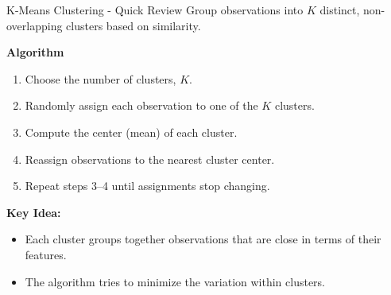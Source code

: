 \documentclass[aspectratio=169,xcolor=dvipsnames]{beamer}
\begin{document}
\begin{frame}{K-Means Clustering - Quick Review}
 Group observations into $K$ distinct, non-overlapping clusters based on similarity.

  \vspace{0.3cm}
  \textbf{Algorithm}
  \begin{enumerate}
    \item Choose the number of clusters, $K$.
    \item Randomly assign each observation to one of the $K$ clusters.
    \item Compute the center (mean) of each cluster.
    \item Reassign observations to the nearest cluster center.
    \item Repeat steps 3–4 until assignments stop changing.
  \end{enumerate}

  \vspace{0.3cm}
  \textbf{Key Idea:} 
  \begin{itemize}
    \item Each cluster groups together observations that are close in terms of their features.
    \item The algorithm tries to minimize the variation within clusters.
  \end{itemize}
\end{frame}
\end{document}
